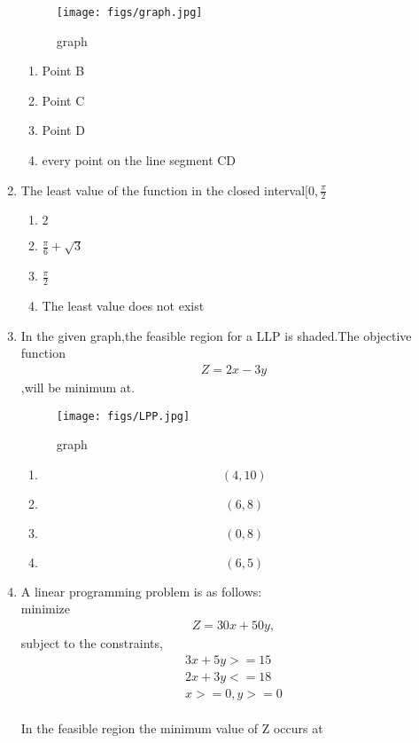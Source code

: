 \documentclass{article}
\begin{document}
\begin{enumerate}
\begin{figure}[H]
	\centering
		\texttt{[image: figs/graph.jpg]}
		\caption{graph}
		\label{fig:graph.jpg}
	\end{figure}
		\begin{enumerate}[label=(\Alph*)]
			\item Point B
			\item Point C
			\item Point D
			\item every point on the line segment CD
		\end{enumerate}
	\item The least value of the function  in the closed interval$[0,\frac{\pi}{2}$
		\begin{enumerate}[label=(\Alph*)]
			\item $2$
			\item $\frac{\pi}{6}+\sqrt{3}$
			\item $\frac{\pi}{2}$
			\item The least value does not exist
		\end{enumerate}
	\item In the given graph,the feasible region for a LLP is shaded.The objective function 
	\begin{align}
		 Z = 2x-3y
	\end{align}
		,will be minimum at.
		\begin{figure}[H]
		\centering
			\texttt{[image: figs/LPP.jpg]}
			\caption{graph}
			\label{fig:LPP.jpg}
		\end{figure}
		\begin{enumerate}%
			\item $$(4,10)$$
			\item $$(6,8)$$
			\item $$(0,8)$$
			\item $$(6,5)$$
		\end{enumerate}
	\item A linear programming problem is as follows:
		\\
		minimize 
	\begin{align}
		  Z = 30x+50y,
	\end{align}
		subject to the constraints,
	\begin{align}
		  3x+5y>=15
		\\ 2x+3y<=18
		\\ x>=0,y>=0
	\end{align}
	\\	In the feasible region the minimum value of Z occurs at

\end{enumerate}
\end{document}
